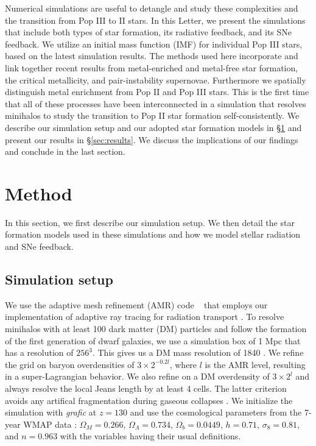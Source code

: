 \documentclass[apjl]{emulateapj}
\begin{document}
Numerical simulations are useful to detangle and study these
complexities and the transition from Pop III to II stars.  In this
Letter, we present the simulations that include both types of star
formation, its radiative feedback, and its SNe feedback.  We utilize
an initial mass function (IMF) for individual Pop III stars, based on
the latest simulation results.  The methods used here incorporate and
link together recent results from metal-enriched and metal-free star
formation, the critical metallicity, and pair-instability supernovae.
Furthermore we spatially distinguish metal enrichment from Pop II and
Pop III stars.  This is the first time that all of these processes
have been interconnected in a simulation that resolves minihalos to
study the transition to Pop II star formation self-consistently.  We
describe our simulation setup and our adopted star formation models in
\S \ref{sec:setup} and present our results in \S \ref{sec:results}.
We discuss the implications of our findings and conclude in the last
section.

\section{Method}
\label{sec:setup}

In this section, we first describe our simulation setup.  We then
detail the star formation models used in these simulations and how we
model stellar radiation and SNe feedback.

\subsection{Simulation setup}

We use the adaptive mesh refinement (AMR) code
\enzo~\citep{BryanNorman97, OShea2004} that employs our implementation
of adaptive ray tracing for radiation transport \citep{Wise10}.  To
resolve minihalos with at least 100 dark matter (DM) particles and
follow the formation of the first generation of dwarf galaxies, we use
a simulation box of 1 Mpc that has a resolution of $256^3$.  This
gives us a DM mass resolution of 1840 \Ms.  We refine the grid on
baryon overdensities of $3 \times 2^{-0.2l}$, where $l$ is the AMR
level, resulting in a super-Lagrangian behavior.  We also refine on a
DM overdensity of $3 \times 2^l$ and always resolve the local Jeans
length by at least 4 cells.  The latter criterion avoids any artifical
fragmentation during gaseous collapses \citep{Truelove97}.  We
initialize the simulation with \textsl{grafic} \citep{Bertschinger01}
at $z = 130$ and use the cosmological parameters from the 7-year WMAP
data \citep{WMAP7}: $\Omega_M = 0.266$, $\Omega_\Lambda = 0.734$,
$\Omega_b = 0.0449$, $h = 0.71$, $\sigma_8 = 0.81$, and $n = 0.963$
with the variables having their usual definitions.
\end{document}
